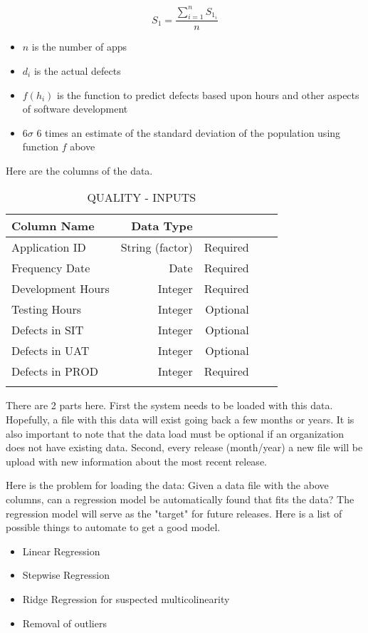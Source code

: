 \documentclass[SDSUThesis.tex]{subfiles}
\begin{document}
\[
    S_{1} = \frac{\sum^n_{i=1} S_{1_i}}{n}
\]
\begin{itemize}
\item $n$ is the number of apps
\item $d_i$ is the actual defects
\item $f(h_i)$ is the function to predict defects based upon hours and other aspects of software development
\item $6\sigma$ 6 times an estimate of the standard deviation of the population using function $f$ above
\end{itemize}

Here are the columns of the data.

\begin{longtable}{@{}l rr rr}

\toprule%
 \centering%
 {\bfseries Column Name}
 & {\bfseries Data Type}
 &  \\

\cmidrule[0.4pt](r{0.125em}){1-1}%
\cmidrule[0.4pt](lr{0.125em}){2-2}%
\cmidrule[0.4pt](l{0.125em}){3-3}%
\endhead

Application ID & String (factor) & Required \\
\myrowcolour%
Frequency Date & Date & Required \\
Development Hours & Integer & Required \\
\myrowcolour%
Testing Hours & Integer & Optional \\ 
Defects in SIT & Integer & Optional \\ 
\myrowcolour%
Defects in UAT & Integer  & Optional \\ 
Defects in PROD & Integer  & Required \\

\bottomrule

\caption{QUALITY - INPUTS}
\label{tab:quality}
\end{longtable}


There are 2 parts here.  First the system needs to be loaded with this data.  Hopefully,
a file with this data will exist going back a few months or years.  It is also important
to note that the data load must be optional if an organization does not have existing
data.  Second, every release (month/year) a new file will be upload with new information
about the most recent release.

Here is the problem for loading the data:
Given a data file with the above columns, can a regression model be automatically found
that fits the data?  The regression model will serve as the "target" for future 
releases.  Here is a list of possible things to automate to get a good model.
\begin{itemize}
\item Linear Regression
\item Stepwise Regression
\item Ridge Regression for suspected multicolinearity
\item Removal of outliers
\end{itemize}
\end{document}
